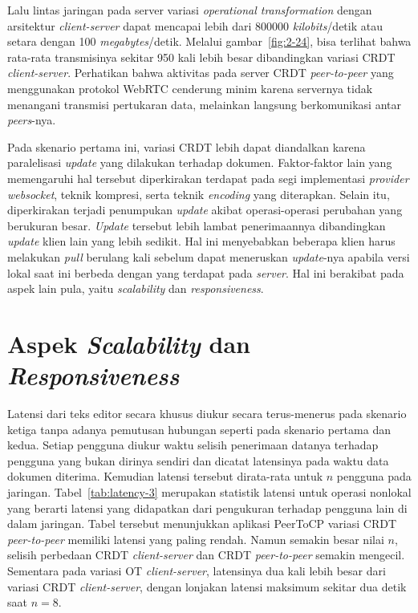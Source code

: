 Lalu lintas jaringan pada server variasi \textit{operational transformation} dengan arsitektur \textit{client-server} dapat mencapai lebih dari 800000 \textit{kilobits}/detik atau setara dengan 100 \textit{megabytes}/detik. Melalui gambar~\ref{fig:2-24}, bisa terlihat bahwa rata-rata transmisinya sekitar 950 kali lebih besar dibandingkan variasi CRDT \textit{client-server}. Perhatikan bahwa aktivitas pada server CRDT \textit{peer-to-peer} yang menggunakan protokol WebRTC cenderung minim karena servernya tidak menangani transmisi pertukaran data, melainkan langsung berkomunikasi antar \textit{peers}-nya.

Pada skenario pertama ini, variasi CRDT lebih dapat diandalkan karena paralelisasi \textit{update} yang dilakukan terhadap dokumen. Faktor-faktor lain yang memengaruhi hal tersebut diperkirakan terdapat pada segi implementasi \textit{provider websocket}, teknik kompresi, serta teknik \textit{encoding} yang diterapkan. Selain itu, diperkirakan terjadi  penumpukan \textit{update} akibat operasi-operasi perubahan yang berukuran besar. \textit{Update} tersebut lebih lambat penerimaannya dibandingkan \textit{update} klien lain yang lebih sedikit. Hal ini menyebabkan beberapa klien harus melakukan \textit{pull} berulang kali sebelum dapat meneruskan \textit{update}-nya apabila versi lokal saat ini berbeda dengan yang terdapat pada \textit{server}. Hal ini berakibat pada aspek lain pula, yaitu \textit{scalability} dan \textit{responsiveness}.

\section{Aspek \textit{Scalability} dan \textit{Responsiveness}}

Latensi dari teks editor secara khusus diukur secara terus-menerus pada skenario ketiga tanpa adanya pemutusan hubungan seperti pada skenario pertama dan kedua. Setiap pengguna diukur waktu selisih penerimaan datanya terhadap pengguna yang bukan dirinya sendiri dan dicatat latensinya pada waktu data dokumen diterima. Kemudian latensi tersebut dirata-rata untuk $n$ pengguna pada jaringan. Tabel~\ref{tab:latency-3} merupakan statistik latensi untuk operasi nonlokal yang berarti latensi yang didapatkan dari pengukuran terhadap pengguna lain di dalam jaringan. Tabel tersebut menunjukkan aplikasi PeerToCP variasi CRDT \textit{peer-to-peer} memiliki latensi yang paling rendah. Namun semakin besar nilai $n$, selisih perbedaan CRDT \textit{client-server} dan CRDT \textit{peer-to-peer} semakin mengecil. Sementara pada variasi OT \textit{client-server}, latensinya dua kali lebih besar dari variasi CRDT \textit{client-server}, dengan lonjakan latensi maksimum sekitar dua detik saat $n = 8$.

